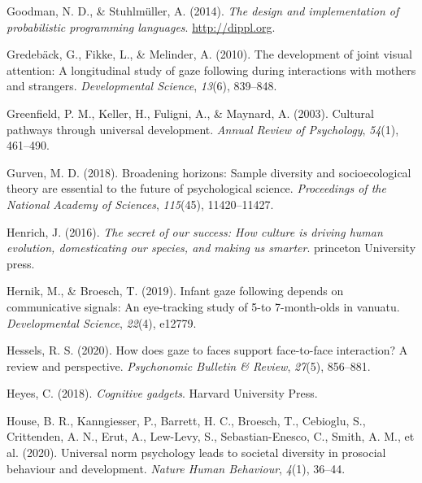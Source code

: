 \documentclass[
  man,floatsintext]{apa7}
\newlength{\cslhangindent}
\newlength{\cslentryspacingunit} %
\newenvironment{CSLReferences}[2] %
 {%
  \setlength{\parindent}{0pt}
  \ifodd #1
  \let\oldpar\par
  \def\par{\hangindent=\cslhangindent\oldpar}
  \fi
  \setlength{\parskip}{#2\cslentryspacingunit}
 }%
 {}
\begin{document}
\begin{CSLReferences}{1}{0}
\leavevmode{}%
Goodman, N. D., \& Stuhlmüller, A. (2014). \emph{{The design and implementation of probabilistic programming languages}}. \url{http://dippl.org}.

\leavevmode{}%
Gredebäck, G., Fikke, L., \& Melinder, A. (2010). The development of joint visual attention: A longitudinal study of gaze following during interactions with mothers and strangers. \emph{Developmental Science}, \emph{13}(6), 839--848.

\leavevmode{}%
Greenfield, P. M., Keller, H., Fuligni, A., \& Maynard, A. (2003). Cultural pathways through universal development. \emph{Annual Review of Psychology}, \emph{54}(1), 461--490.

\leavevmode{}%
Gurven, M. D. (2018). Broadening horizons: Sample diversity and socioecological theory are essential to the future of psychological science. \emph{Proceedings of the National Academy of Sciences}, \emph{115}(45), 11420--11427.

\leavevmode{}%
Henrich, J. (2016). \emph{The secret of our success: How culture is driving human evolution, domesticating our species, and making us smarter}. princeton University press.

\leavevmode{}%
Hernik, M., \& Broesch, T. (2019). Infant gaze following depends on communicative signals: An eye-tracking study of 5-to 7-month-olds in vanuatu. \emph{Developmental Science}, \emph{22}(4), e12779.

\leavevmode{}%
Hessels, R. S. (2020). How does gaze to faces support face-to-face interaction? A review and perspective. \emph{Psychonomic Bulletin \& Review}, \emph{27}(5), 856--881.

\leavevmode{}%
Heyes, C. (2018). \emph{Cognitive gadgets}. Harvard University Press.

\leavevmode{}%
House, B. R., Kanngiesser, P., Barrett, H. C., Broesch, T., Cebioglu, S., Crittenden, A. N., Erut, A., Lew-Levy, S., Sebastian-Enesco, C., Smith, A. M., et al. (2020). Universal norm psychology leads to societal diversity in prosocial behaviour and development. \emph{Nature Human Behaviour}, \emph{4}(1), 36--44.


\end{CSLReferences}
\end{document}

